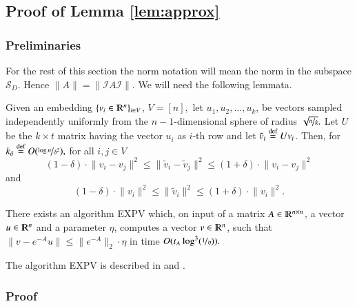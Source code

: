 \documentclass[twoside,leqno,twocolumn]{article}
\newcommand{\nfrac}{\nicefrac}
\renewcommand{\mathbb}{\varmathbb}
\renewcommand{\leq}{\leqslant}
\newcommand{\cI}{\mathcal I}
\newcommand{\cS}{\mathcal S}
\newcommand{\norm}[1]{\lVert#1\rVert}
\newcommand{\defeq}{\stackrel{\textup{def}}{=}}
\newcommand{\normt}[1]{\norm{#1}_{\scriptstyle 2}}
\newcommand{\R}{\mathbb R}
\numberwithin{equation}{section}
\begin{document}
\subsection{Proof of Lemma \ref{lem:approx}}\label{app:exp}


\subsubsection{Preliminaries}
For the rest of this section the norm notation will mean the norm in the subspace $\cS_D.$ Hence $\norm{A}=\norm{\cI A \cI}.$
We will need the following lemmata.

\begin{lemma}\label{lem:jl}
Given an embedding $\{v_i \in \R^n\}_{i \in V}$, $V=[n],$ let $u_1, u_2, \ldots, u_k$, be vectors sampled independently uniformly from the $n-1$-dimensional sphere of radius $\sqrt{\nfrac{n}{k}}.$ Let $U$ be the $k \times t$ matrix having the vector $u_i$ as $i$-th row and let $\tilde{v}_i \defeq  U v_i$. Then, for $k_\delta \defeq O(\nfrac{\log n}{\delta^2}),$ for all $i, j \in V$ 
$$
(1 - \delta) \cdot \norm{v_i - v_j}^2 \leq \norm{\tilde{v}_i - \tilde{v}_j}^2 \leq (1 + \delta)\cdot  \norm{v_i - v_j}^2
$$
and
$$
(1 - \delta) \cdot \norm{v_i}^2 \leq \norm{\tilde{v}_i}^2 \leq (1 + \delta) \cdot\norm{v_i}^2.
$$
\end{lemma}

\begin{lemma}\label{lem:expv} 
There exists an algorithm {\sf EXPV} which, on input of a matrix $A \in \R^{n \times n}$, a vector $u \in \R^n$ and a parameter $\eta$, computes a vector $v \in \R^n$, such that $\norm{v - e^{-A}u} \leq \normt{e^{-A}} \cdot \eta$ in time $O(t_A \log^3(\nfrac{1}{\eta})).$
\end{lemma}
\noindent
The algorithm {\sf EXPV} is described in \cite{Kthesis} and \cite{YPS} .

\subsubsection{Proof}
\end{document}

